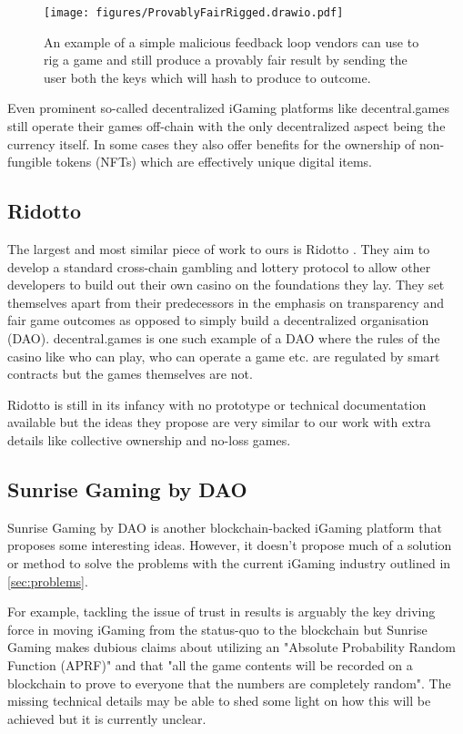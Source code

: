 \documentclass[10pt,journal,compsoc]{IEEEtran}
\begin{document}
\begin{figure}[!h]
    \centering
    \texttt{[image: figures/ProvablyFairRigged.drawio.pdf]}
    \caption{An example of a simple malicious feedback loop vendors can use to rig a game and still produce a provably fair result by sending the user both the keys which will hash to produce to outcome.}
    \label{fig:provablyfaiir}
\end{figure}


Even prominent so-called decentralized iGaming platforms like decentral.games \cite{DecentralGames2019} still operate their games off-chain with the only decentralized aspect being the currency itself. In some cases they also offer benefits for the ownership of non-fungible tokens (NFTs) which are effectively unique digital items.

\subsection{Ridotto}
The largest and most similar piece of work to ours is Ridotto \cite{ridotto}. They aim to develop a standard cross-chain gambling and lottery protocol to allow other developers to build out their own casino on the foundations they lay. They set themselves apart from their predecessors in the emphasis on transparency and fair game outcomes as opposed to simply build a decentralized organisation (DAO). decentral.games is one such example of a DAO where the rules of the casino like who can play, who can operate a game etc. are regulated by smart contracts but the games themselves are not. 

Ridotto is still in its infancy with no prototype or technical documentation available but the ideas they propose are very similar to our work with extra details like collective ownership and no-loss games.

\subsection{Sunrise Gaming by DAO}
Sunrise Gaming by DAO \cite{sunrise_gaming_by_dao} is another blockchain-backed iGaming platform that proposes some interesting ideas. However, it doesn't propose much of a solution or method to solve the problems with the current iGaming industry outlined in \ref{sec:problems}.

For example, tackling the issue of trust in results is arguably the key driving force in moving iGaming from the status-quo to the blockchain but Sunrise Gaming makes dubious claims about utilizing an "Absolute Probability Random Function (APRF)" and that "all the game contents will be recorded on a blockchain to prove to everyone that the numbers are completely random". The missing technical details may be able to shed some light on how this will be achieved but it is currently unclear.
\end{document}
